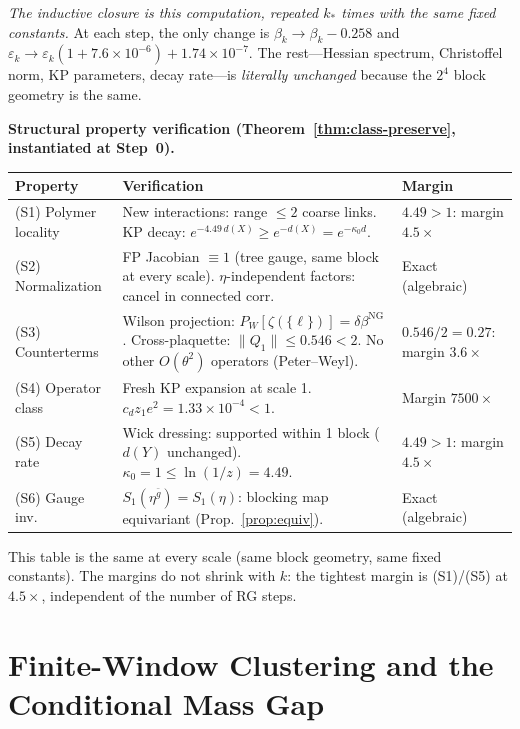 \documentclass[11pt]{article}
\theoremstyle{definition}
\begin{document}
\emph{The inductive closure is this computation, repeated
$k_*$ times with the same fixed constants.}
At each step, the only change is $\beta_k\to\beta_k-0.258$
and $\varepsilon_k\to\varepsilon_k(1+7.6\times 10^{-6})
+1.74\times 10^{-7}$.  The rest---Hessian spectrum, Christoffel
norm, KP parameters, decay rate---is \emph{literally unchanged}
because the $2^4$ block geometry is the same.

\medskip\noindent
\textbf{Structural property verification
\textup{(}Theorem~\ref{thm:class-preserve},
instantiated at Step~0\textup{)}.}

\begin{center}
\renewcommand{\arraystretch}{1.15}
\begin{tabular}{p{2.5cm}p{5.8cm}p{4.5cm}}
\toprule
\textbf{Property} & \textbf{Verification} & \textbf{Margin}\\
\midrule
(S1) Polymer locality &
New interactions: range $\le 2$ coarse links.
KP decay: $e^{-4.49\,d(X)}\ge e^{-d(X)}=e^{-\kappa_0 d}$. &
$4.49>1$: margin $4.5\times$\\
(S2) Normalization &
FP Jacobian $\equiv 1$
(tree gauge, same block at every scale).
$\eta$-independent factors: cancel in connected corr. &
Exact (algebraic)\\
(S3) Counterterms &
Wilson projection: $P_W[\zeta(\{\ell\})]
=\delta\beta^{\mathrm{NG}}$.
Cross-plaquette: $\|Q_1\|\le 0.546<2$.
No other $O(\theta^2)$ operators (Peter--Weyl). &
$0.546/2=0.27$: margin $3.6\times$\\
(S4) Operator class &
Fresh KP expansion at scale 1.
$c_d z_1 e^2=1.33\times 10^{-4}<1$. &
Margin $7500\times$\\
(S5) Decay rate &
Wick dressing: supported within 1 block
($d(Y)$ unchanged).
$\kappa_0=1\le\ln(1/z)=4.49$. &
$4.49>1$: margin $4.5\times$\\
(S6) Gauge inv. &
$S_1(\eta^{\bar g})=S_1(\eta)$:
blocking map equivariant
(Prop.~\ref{prop:equiv}). &
Exact (algebraic)\\
\bottomrule
\end{tabular}
\end{center}

\noindent
This table is the same at every scale (same block
geometry, same fixed constants). The margins do not
shrink with $k$: the tightest margin is (S1)/(S5) at
$4.5\times$, independent of the number of RG steps.

\section{Finite-Window Clustering and the Conditional Mass Gap}\label{sec:massgap}
\end{document}
